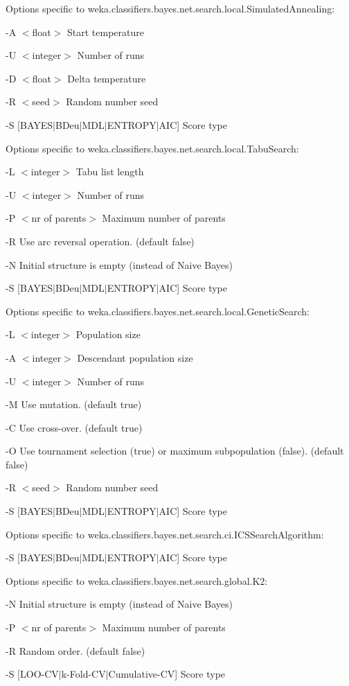 \documentclass{article}
\begin{document}
\noindent 
Options specific to weka.classifiers.bayes.net.search.local.SimulatedAnnealing:

-A $<$float$>$
	Start temperature

-U $<$integer$>$
	Number of runs

-D $<$float$>$
	Delta temperature

-R $<$seed$>$
	Random number seed

-S [BAYES$|$BDeu$|$MDL$|$ENTROPY$|$AIC]
	Score type 


\noindent 
Options specific to weka.classifiers.bayes.net.search.local.TabuSearch:

-L $<$integer$>$
	Tabu list length

-U $<$integer$>$
	Number of runs

-P $<$nr of parents$>$
	Maximum number of parents

-R
	Use arc reversal operation.
	(default false)

-N
	Initial structure is empty (instead of Naive Bayes)

-S [BAYES$|$BDeu$|$MDL$|$ENTROPY$|$AIC]
	Score type 


\noindent 
Options specific to weka.classifiers.bayes.net.search.local.GeneticSearch:

-L $<$integer$>$
	Population size

-A $<$integer$>$
	Descendant population size

-U $<$integer$>$
	Number of runs

-M
	Use mutation.
	(default true)

-C
	Use cross-over.
	(default true)

-O
	Use tournament selection (true) or maximum subpopulation (false).
	(default false)

-R $<$seed$>$
	Random number seed

-S [BAYES$|$BDeu$|$MDL$|$ENTROPY$|$AIC]
	Score type 


\noindent 
Options specific to weka.classifiers.bayes.net.search.ci.ICSSearchAlgorithm:

-S [BAYES$|$BDeu$|$MDL$|$ENTROPY$|$AIC]
	Score type 


\noindent 
Options specific to weka.classifiers.bayes.net.search.global.K2:

-N
	Initial structure is empty (instead of Naive Bayes)

-P $<$nr of parents$>$
	Maximum number of parents

-R
	Random order.
	(default false)

-S [LOO-CV$|$k-Fold-CV$|$Cumulative-CV]
	Score type 
\end{document}
